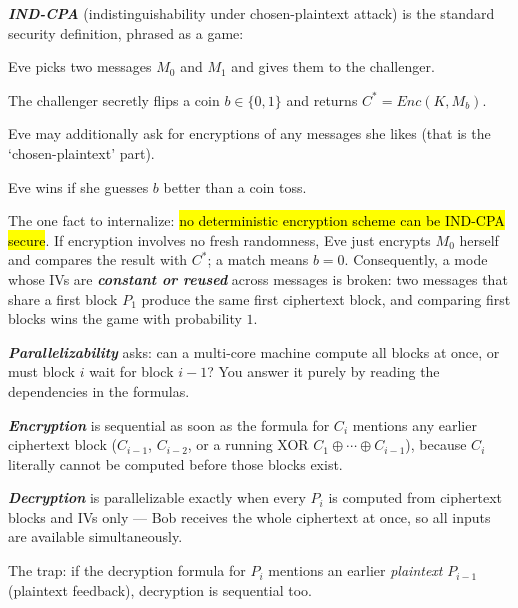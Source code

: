 \documentclass[12pt, a4paper]{article}
\newcommand{\term}[1]{\textbf{\textit{#1}}}        %
\newcommand{\imp}[1]{\hl{#1}}                       %
\begin{document}
\term{IND-CPA} (indistinguishability under chosen-plaintext attack) is the standard security definition, phrased as a game: \begin{tightitem} \item Eve picks two messages $M_0$ and $M_1$ and gives them to the challenger. \item The challenger secretly flips a coin $b \in \{0, 1\}$ and returns $C^* = Enc(K, M_b)$. \item Eve may additionally ask for encryptions of any messages she likes (that is the `chosen-plaintext' part). \item Eve wins if she guesses $b$ better than a coin toss. \end{tightitem} The one fact to internalize: \imp{no deterministic encryption scheme can be IND-CPA secure}. If encryption involves no fresh randomness, Eve just encrypts $M_0$ herself and compares the result with $C^*$; a match means $b = 0$. Consequently, a mode whose IVs are \term{constant or reused} across messages is broken: two messages that share a first block $P_1$ produce the same first ciphertext block, and comparing first blocks wins the game with probability $1$.

\term{Parallelizability} asks: can a multi-core machine compute all blocks at once, or must block $i$ wait for block $i - 1$? You answer it purely by reading the dependencies in the formulas. \begin{tightitem} \item \term{Encryption} is sequential as soon as the formula for $C_i$ mentions any earlier ciphertext block ($C_{i-1}$, $C_{i-2}$, or a running XOR $C_1 \oplus \cdots \oplus C_{i-1}$), because $C_i$ literally cannot be computed before those blocks exist. \item \term{Decryption} is parallelizable exactly when every $P_i$ is computed from ciphertext blocks and IVs only --- Bob receives the whole ciphertext at once, so all inputs are available simultaneously. \item The trap: if the decryption formula for $P_i$ mentions an earlier \emph{plaintext} $P_{i-1}$ (plaintext feedback), decryption is sequential too. \end{tightitem}
\end{document}
